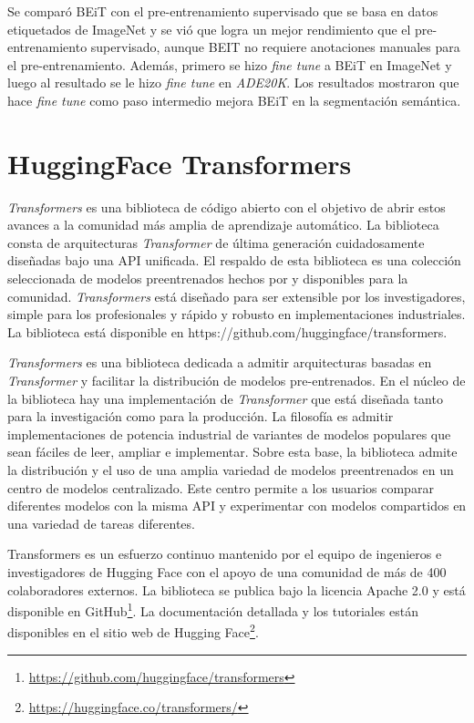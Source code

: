 Se comparó BEiT con el pre-entrenamiento supervisado que se basa en datos etiquetados de ImageNet y se vió que logra un mejor rendimiento que el pre-entrenamiento supervisado, aunque BEIT no requiere anotaciones manuales para el pre-entrenamiento. Además, primero se hizo \textit{fine tune} a BEiT en ImageNet y luego al resultado se le hizo \textit{fine tune} en \textit{ADE20K}. Los resultados mostraron que hace \textit{fine tune} como paso intermedio mejora BEiT en la segmentación semántica.

\section{HuggingFace Transformers}
\textit{Transformers} \parencite{95} es una biblioteca de código abierto con el objetivo de abrir estos avances a la comunidad más amplia de aprendizaje automático. La biblioteca consta de arquitecturas \textit{Transformer} de última generación cuidadosamente diseñadas bajo una API unificada. El respaldo de esta biblioteca es una colección seleccionada de modelos preentrenados hechos por y disponibles para la comunidad. \textit{Transformers} está diseñado para ser extensible por los investigadores, simple para los profesionales y rápido y robusto en implementaciones industriales. La biblioteca está disponible en https://github.com/huggingface/transformers.

\textit{Transformers} es una biblioteca dedicada a admitir arquitecturas basadas en \textit{Transformer} y facilitar la distribución de modelos pre-entrenados. En el núcleo de la biblioteca hay una implementación de \textit{Transformer} que está diseñada tanto para la investigación como para la producción. La filosofía es admitir implementaciones de potencia industrial de variantes de modelos populares que sean fáciles de leer, ampliar e implementar. Sobre esta base, la biblioteca admite la distribución y el uso de una amplia variedad de modelos preentrenados en un centro de modelos centralizado. Este centro permite a los usuarios comparar diferentes modelos con la misma API y experimentar con modelos compartidos en una variedad de tareas diferentes.

Transformers es un esfuerzo continuo mantenido por el equipo de ingenieros e investigadores de Hugging Face con el apoyo de una comunidad de más de 400 colaboradores externos. La biblioteca se publica bajo la licencia Apache 2.0 y está disponible en GitHub\footnote[1]{\url{https://github.com/huggingface/transformers}}. La documentación detallada y los tutoriales están disponibles en el sitio web de Hugging Face\footnote[2]{\url{https://huggingface.co/transformers/}}.

